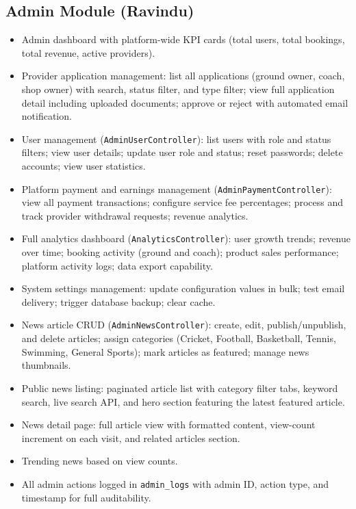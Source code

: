 \documentclass[12pt,a4paper]{report}
\begin{document}
\subsection{Admin Module (Ravindu)}

\begin{itemize}[leftmargin=1.5cm]
  \item Admin dashboard with platform-wide KPI cards (total users, total bookings, total revenue, active providers).
  \item Provider application management: list all applications (ground owner, coach, shop owner) with search, status filter, and type filter; view full application detail including uploaded documents; approve or reject with automated email notification.
  \item User management (\texttt{AdminUserController}): list users with role and status filters; view user details; update user role and status; reset passwords; delete accounts; view user statistics.
  \item Platform payment and earnings management (\texttt{AdminPaymentController}): view all payment transactions; configure service fee percentages; process and track provider withdrawal requests; revenue analytics.
  \item Full analytics dashboard (\texttt{AnalyticsController}): user growth trends; revenue over time; booking activity (ground and coach); product sales performance; platform activity logs; data export capability.
  \item System settings management: update configuration values in bulk; test email delivery; trigger database backup; clear cache.
  \item News article CRUD (\texttt{AdminNewsController}): create, edit, publish/unpublish, and delete articles; assign categories (Cricket, Football, Basketball, Tennis, Swimming, General Sports); mark articles as featured; manage news thumbnails.
  \item Public news listing: paginated article list with category filter tabs, keyword search, live search API, and hero section featuring the latest featured article.
  \item News detail page: full article view with formatted content, view-count increment on each visit, and related articles section.
  \item Trending news based on view counts.
  \item All admin actions logged in \texttt{admin\_logs} with admin ID, action type, and timestamp for full auditability.
\end{itemize}
\end{document}
